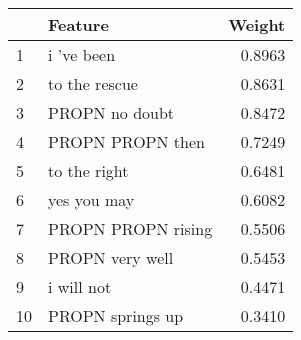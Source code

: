 \begin{tabular}{llr}
\toprule
{} &             Feature &  Weight \\
\midrule
1  &          i 've been &  0.8963 \\
2  &       to the rescue &  0.8631 \\
3  &      PROPN no doubt &  0.8472 \\
4  &    PROPN PROPN then &  0.7249 \\
5  &        to the right &  0.6481 \\
6  &         yes you may &  0.6082 \\
7  &  PROPN PROPN rising &  0.5506 \\
8  &     PROPN very well &  0.5453 \\
9  &          i will not &  0.4471 \\
10 &    PROPN springs up &  0.3410 \\
\bottomrule
\end{tabular}

